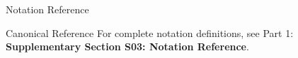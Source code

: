 \documentclass[
  ignorenonframetext,
]{beamer}
\begin{document}
\begin{frame}{Notation Reference}
\begin{block}{Canonical Reference}
\protect{}\label{canonical-reference}
For complete notation definitions, see Part 1: \textbf{Supplementary
Section S03: Notation Reference}.
\end{block}
\end{frame}
\end{document}
